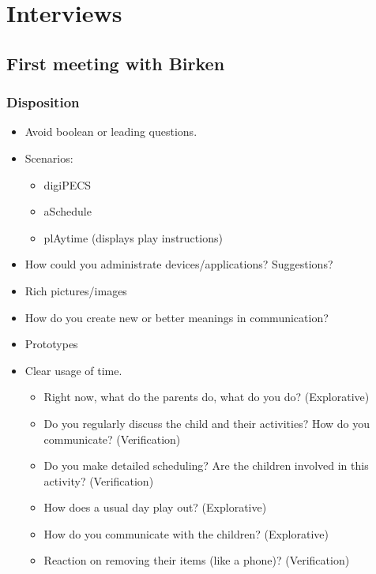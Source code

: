 \chapter{Interviews}
\section{First meeting with Birken}
\subsection{Disposition}
\begin{itemize}
	\item Avoid boolean or leading questions.
	\item Scenarios:
		\begin{itemize}
			\item digiPECS
			\item aSchedule
			\item plAytime (displays play instructions)
		\end{itemize}
	\item How could you administrate devices/applications? Suggestions?
	\item Rich pictures/images
	\item How do you create new or better meanings in communication?
	\item Prototypes
	\item Clear usage of time.
		\begin{itemize}
			\item Right now, what do the parents do, what do you do? (Explorative)
			\item Do you regularly discuss the child and their activities? How do you communicate? (Verification)
			\item Do you make detailed scheduling? Are the children involved in this activity? (Verification)
			\item How does a usual day play out? (Explorative)
			\item How do you communicate with the children? (Explorative)
			\item Reaction on removing their items (like a phone)? (Verification)
		\end{itemize}
\end{itemize}
